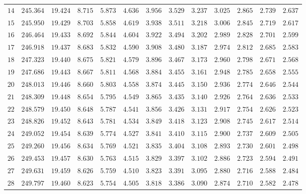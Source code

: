 \begin{tabular}{rrrrrrrrrrrrr}
  $14$ & $245.364$ & $19.424$ & $8.715$ & $5.873$ & $4.636$ & $3.956$ & $3.529$ & $3.237$ & $3.025$ & $2.865$ & $2.739$ & $2.637$ \\ 
  $15$ & $245.950$ & $19.429$ & $8.703$ & $5.858$ & $4.619$ & $3.938$ & $3.511$ & $3.218$ & $3.006$ & $2.845$ & $2.719$ & $2.617$ \\ 
  $16$ & $246.464$ & $19.433$ & $8.692$ & $5.844$ & $4.604$ & $3.922$ & $3.494$ & $3.202$ & $2.989$ & $2.828$ & $2.701$ & $2.599$ \\ 
  $17$ & $246.918$ & $19.437$ & $8.683$ & $5.832$ & $4.590$ & $3.908$ & $3.480$ & $3.187$ & $2.974$ & $2.812$ & $2.685$ & $2.583$ \\ 
  $18$ & $247.323$ & $19.440$ & $8.675$ & $5.821$ & $4.579$ & $3.896$ & $3.467$ & $3.173$ & $2.960$ & $2.798$ & $2.671$ & $2.568$ \\ 
  $19$ & $247.686$ & $19.443$ & $8.667$ & $5.811$ & $4.568$ & $3.884$ & $3.455$ & $3.161$ & $2.948$ & $2.785$ & $2.658$ & $2.555$ \\ 
  $20$ & $248.013$ & $19.446$ & $8.660$ & $5.803$ & $4.558$ & $3.874$ & $3.445$ & $3.150$ & $2.936$ & $2.774$ & $2.646$ & $2.544$ \\ 
  $21$ & $248.309$ & $19.448$ & $8.654$ & $5.795$ & $4.549$ & $3.865$ & $3.435$ & $3.140$ & $2.926$ & $2.764$ & $2.636$ & $2.533$ \\ 
  $22$ & $248.579$ & $19.450$ & $8.648$ & $5.787$ & $4.541$ & $3.856$ & $3.426$ & $3.131$ & $2.917$ & $2.754$ & $2.626$ & $2.523$ \\ 
  $23$ & $248.826$ & $19.452$ & $8.643$ & $5.781$ & $4.534$ & $3.849$ & $3.418$ & $3.123$ & $2.908$ & $2.745$ & $2.617$ & $2.514$ \\ 
  $24$ & $249.052$ & $19.454$ & $8.639$ & $5.774$ & $4.527$ & $3.841$ & $3.410$ & $3.115$ & $2.900$ & $2.737$ & $2.609$ & $2.505$ \\ 
  $25$ & $249.260$ & $19.456$ & $8.634$ & $5.769$ & $4.521$ & $3.835$ & $3.404$ & $3.108$ & $2.893$ & $2.730$ & $2.601$ & $2.498$ \\ 
  $26$ & $249.453$ & $19.457$ & $8.630$ & $5.763$ & $4.515$ & $3.829$ & $3.397$ & $3.102$ & $2.886$ & $2.723$ & $2.594$ & $2.491$ \\ 
  $27$ & $249.631$ & $19.459$ & $8.626$ & $5.759$ & $4.510$ & $3.823$ & $3.391$ & $3.095$ & $2.880$ & $2.716$ & $2.588$ & $2.484$ \\ 
  $28$ & $249.797$ & $19.460$ & $8.623$ & $5.754$ & $4.505$ & $3.818$ & $3.386$ & $3.090$ & $2.874$ & $2.710$ & $2.582$ & $2.478$ \\ 

\end{tabular}
